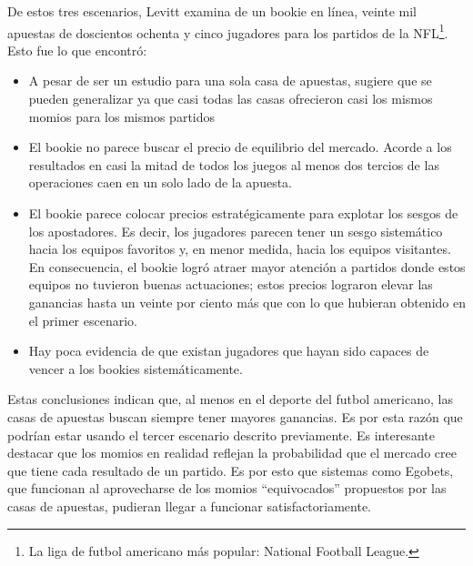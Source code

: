  De estos tres escenarios, Levitt \cite{levitt2004gambling} examina de un bookie en línea, veinte mil apuestas de doscientos ochenta y cinco jugadores para los partidos de la NFL\footnote{La liga de futbol americano más popular: National Football League.}. Esto fue lo que encontró:
 \begin{itemize}
  \item A pesar de ser un estudio para una sola casa de apuestas, sugiere que se pueden generalizar ya que casi todas las casas ofrecieron casi los mismos momios para los mismos partidos
  \item El bookie no parece buscar el precio de equilibrio del mercado. Acorde a los resultados en casi la mitad de todos los juegos al menos dos tercios de las operaciones caen en un solo lado de la apuesta.
  \item El bookie parece colocar precios estratégicamente para explotar los sesgos de los apostadores. Es decir, los jugadores parecen tener un sesgo sistemático hacia los equipos favoritos y, en menor medida, hacia los equipos visitantes. En consecuencia, el bookie logró atraer mayor atención a partidos donde estos equipos no tuvieron buenas actuaciones; estos precios lograron elevar las ganancias hasta un veinte por ciento más que con lo que hubieran obtenido en el primer escenario.
  \item Hay poca evidencia de que existan jugadores que hayan sido capaces de vencer a los bookies sistemáticamente.
  \end{itemize}
 
 Estas conclusiones indican que, al menos en el deporte del futbol americano, las casas de apuestas buscan siempre tener mayores ganancias. Es por esta razón que podrían estar usando el tercer escenario descrito previamente. Es interesante destacar que los momios en realidad reflejan la probabilidad que el mercado cree que tiene cada resultado de un partido. Es por esto que sistemas como Egobets, que funcionan al aprovecharse de los momios ``equivocados'' propuestos por las casas de apuestas, pudieran llegar a funcionar satisfactoriamente.
 
 
 

